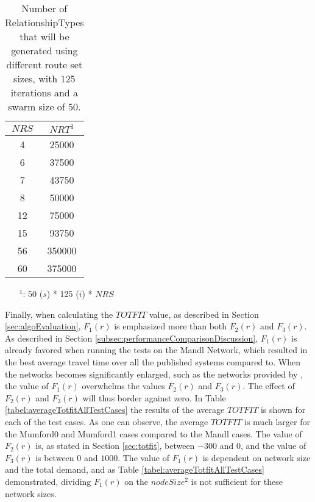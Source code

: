 \begin{table}[H]
    \centering
    \begin{tabular}{|c|c|}
        \hline
        \textbf{$NRS$} & \textbf{$NRT^1$}\\
        \hline
        4 & 25000\\
        
        6 & 37500\\
       
        7 & 43750\\
        
        8 & 50000\\
       
        12 & 75000\\
        
        15 & 93750\\
        
        56 & 350000\\
        
        60 & 375000\\
        \hline
    \end{tabular}
    \caption{Number of RelationshipTypes that will be generated using different route set sizes, with 125 iterations and a swarm size of 50.}
    \begin{itemize}[noitemsep]
    \item[$^1$:] 50 ($s$) * 125 ($i$) * $NRS$
    \end{itemize} 
    \label{tabel:numberOfRelationshipTypes}
\end{table} 

Finally, when calculating the $TOTFIT$ value, as described in Section \vref{sec:algoEvaluation}, $F_1(r)$ is emphasized more than both $F_2(r)$ and $F_3(r)$. As described in Section \vref{subsec:performanceComparisonDiscussion}, $F_1(r)$ is already favored when running the tests on the Mandl Network, which resulted in the best average travel time over all the published systems compared to. When the networks becomes significantly enlarged, such as the networks provided by \citet{mumford13}, the value of $F_1(r)$ overwhelms the values $F_2(r)$ and $F_3(r)$. The effect of $F_2(r)$ and $F_3(r)$ will thus border against zero. In Table \ref{tabel:averageTotfitAllTestCases} the results of the average $TOTFIT$ is shown for each of the test cases. As one can observe, the average $TOTFIT$ is much larger for the Mumford0 and Mumford1 cases compared to the Mandl cases. The value of $F_2(r)$ is, as stated in Section \vref{sec:totfit}, between $-300$ and $0$, and the value of $F_3(r)$ is between $0$ and $1000$. The value of $F_1(r)$ is dependent on network size and the total demand, and as Table \vref{tabel:averageTotfitAllTestCases} demonstrated, dividing $F_1(r)$ on the $nodeSize^2$ is not sufficient for these network sizes. %

